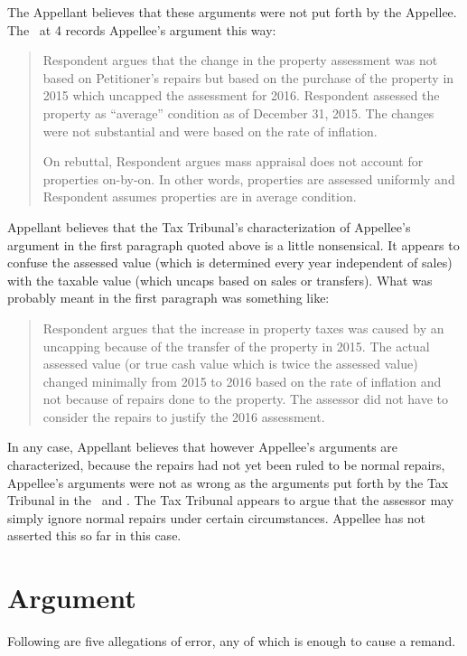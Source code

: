 \documentclass[12pt,\documentclassflag]{michiganCourtOfAppealsBrief}
\begin{document}
The Appellant believes that these arguments were not put forth by the Appellee. The \FOJ\ at 4 records Appellee's argument this way:

\begin{quotation}
	Respondent argues that the change in the property assessment was not based on Petitioner's repairs but based on the purchase of the property in 2015 which uncapped the assessment for 2016. Respondent assessed the property as ``average'' condition as of December 31, 2015. The changes were not substantial and were based on the rate of inflation.
	
	On rebuttal, Respondent argues mass appraisal does not account for properties on-by-on. In other words, properties are assessed uniformly and Respondent assumes properties are in average condition.
\end{quotation}

Appellant believes that the Tax Tribunal's characterization of Appellee's argument in the first paragraph quoted above is a little nonsensical. It appears to confuse the assessed value (which is determined every year independent of sales) with the taxable value (which uncaps based on sales or transfers). What was probably meant in the first paragraph was something like: 

\begin{quote}
	Respondent argues that the increase in property taxes was caused by an uncapping because of the transfer of the property in 2015. The actual assessed value (or true cash value which is twice the assessed value) changed minimally from 2015 to 2016 based on the rate of inflation and not because of repairs done to the property. The assessor did not have to consider the repairs to justify the 2016 assessment. 
\end{quote}

In any case, Appellant believes that however Appellee's arguments are characterized, because the repairs had not yet been ruled to be normal repairs, Appellee's arguments were not as wrong as the arguments put forth by the Tax Tribunal in the \FOJ\ and \orderDenying. The Tax Tribunal appears to argue that the assessor may simply ignore normal repairs under certain circumstances. Appellee has not asserted this so far in this case.

\section{Argument}

Following are five allegations of error, any of which is enough to cause a remand. 
\end{document}
